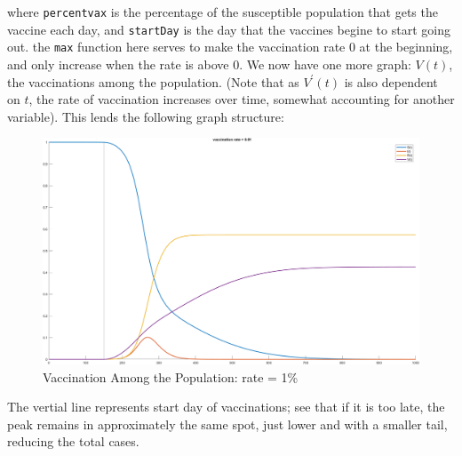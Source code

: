 \documentclass{article}
\begin{document}
where \texttt{percentvax} is the percentage of the susceptible population that gets the vaccine each day, and \texttt{startDay} is the day that the vaccines begine to start going out. the \texttt{max} function here serves to make the vaccination rate 0 at the beginning, and only increase when the rate is above 0.
We now have one more graph: $V(t)$, the vaccinations among the population. (Note that as $V^\prime(t)$ is also dependent on $t$, the rate of vaccination increases over time, somewhat accounting for another variable). This lends the following graph structure:


\begin{figure}[H]
    \centering
    \includegraphics[scale=0.4]{vax1.png}
    \caption{Vaccination Among the Population: rate = 1\%}
    \label{fig3}
\end{figure}

The vertial line represents start day of vaccinations; see that if it is too late, the peak remains in approximately the same spot, just lower and with a smaller tail, reducing the total cases.
\end{document}
